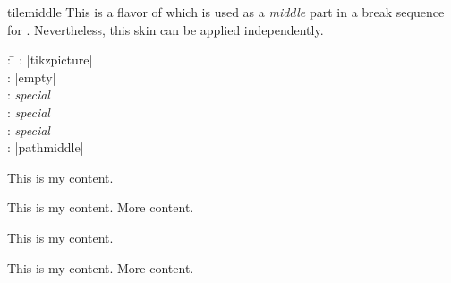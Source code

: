 \clearpage
\begin{docSkin}[doc new=2016-02-25]{tilemiddle}
This is a flavor of  which is used as a \emph{middle} part
in a break sequence for .
Nevertheless, this skin can be applied independently.
\begin{tcolorbox}[skintable=tilemiddle]
  \begin{tabbing}
    : \=\kill
    :  \> |tikzpicture|\\ 
    :           \> |empty|\\
    : \> \emph{special}\\ 
    :        \> \emph{special}\\
    :    \> \emph{special}\\
    :           \> |pathmiddle|
  \end{tabbing}
\end{tcolorbox}
\end{docSkin}


\begin{dispExample}
\begin{tcbraster}[skin=tilemiddle,raster equal height,raster columns=4,
    colback=LightGreen,colframe=DarkGreen,colbacklower=LimeGreen!75!LightGreen,
    colbacktitle=LimeGreen!75!DarkGreen,
    left=1mm,right=1mm,top=1mm,bottom=1mm,middle=1mm,boxrule=0pt]
  \begin{tcolorbox}
    This is my content.
  \end{tcolorbox}
  \begin{tcolorbox}
    This is my content.
    \tcblower
    More content.
  \end{tcolorbox}
  \begin{tcolorbox}[adjusted title=My title]
    This is my content.
  \end{tcolorbox}
  \begin{tcolorbox}[adjusted title=My title]
    This is my content.
    \tcblower
    More content.
  \end{tcolorbox}
\end{tcbraster}
\end{dispExample}


